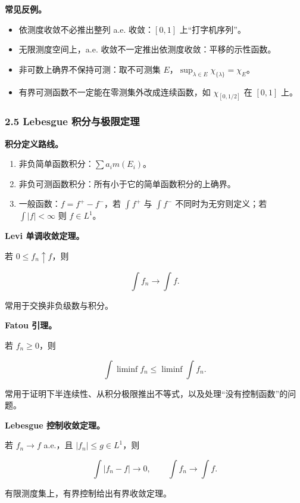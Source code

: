 \documentclass[
UTF8]{ctexart}
\providecommand{\tightlist}{%
\setlength{\itemsep}{0pt}\setlength{\parskip}{0pt}}
\begin{document}
\textbf{常见反例。}

\begin{itemize}
    \tightlist
  \item
    依测度收敛不必推出整列 a.e. 收敛：\([0,1]\) 上``打字机序列''。
  \item
    无限测度空间上，a.e. 收敛不一定推出依测度收敛：平移的示性函数。
  \item
    非可数上确界不保持可测：取不可测集
    \(E\)，\(\sup_{\lambda\in E}\chi_{\{\lambda\}}=\chi_E\)。
  \item
    有界可测函数不一定能在零测集外改成连续函数，如 \(\chi_{[0,1/2]}\) 在
    \([0,1]\) 上。
\end{itemize}

\subsubsection{2.5 Lebesgue
积分与极限定理}\label{lebesgue-ux79efux5206ux4e0eux6781ux9650ux5b9aux7406}

\textbf{积分定义路线。}

\begin{enumerate}
    \def\labelenumi{\arabic{enumi}.}
    \tightlist
  \item
    非负简单函数积分：\(\sum a_i m(E_i)\)。
  \item
    非负可测函数积分：所有小于它的简单函数积分的上确界。
  \item
    一般函数：\(f=f^+-f^-\)，若 \(\int f^+\) 与 \(\int f^-\)
    不同时为无穷则定义；若 \(\int |f|<\infty\) 则 \(f\in L^1\)。
\end{enumerate}

\textbf{Levi 单调收敛定理。}

若 \(0\le f_n\uparrow f\)，则

\[
  \int f_n \to \int f.
\]

常用于交换非负级数与积分。

\textbf{Fatou 引理。}

若 \(f_n\ge0\)，则

\[
  \int \liminf f_n \le \liminf \int f_n.
\]

常用于证明下半连续性、从积分极限推出不等式，以及处理``没有控制函数''的问题。

\textbf{Lebesgue 控制收敛定理。}

若 \(f_n\to f\) a.e.，且 \(|f_n|\le g\in L^1\)，则

\[
  \int |f_n-f|\to0,\qquad \int f_n\to\int f.
\]

有限测度集上，有界控制给出有界收敛定理。
\end{document}
